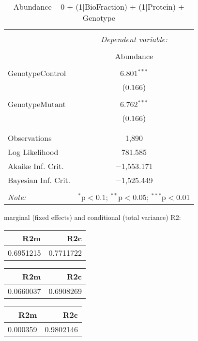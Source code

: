 \documentclass[11pt]{report}
\begin{document}
\begin{table}[!htbp] \centering 
  \caption{Abundance ~ 0 + (1|BioFraction) + (1|Protein) + Genotype} 
  \label{} 
\begin{tabular}{@{\extracolsep{5pt}}lc} 
\\[-1.8ex]\hline 
\hline \\[-1.8ex] 
 & \multicolumn{1}{c}{\textit{Dependent variable:}} \\ 
\cline{2-2} 
\\[-1.8ex] & Abundance \\ 
\hline \\[-1.8ex] 
 GenotypeControl & 6.801$^{***}$ \\ 
  & (0.166) \\ 
  & \\ 
 GenotypeMutant & 6.762$^{***}$ \\ 
  & (0.166) \\ 
  & \\ 
\hline \\[-1.8ex] 
Observations & 1,890 \\ 
Log Likelihood & 781.585 \\ 
Akaike Inf. Crit. & $-$1,553.171 \\ 
Bayesian Inf. Crit. & $-$1,525.449 \\ 
\hline 
\hline \\[-1.8ex] 
\textit{Note:}  & \multicolumn{1}{r}{$^{*}$p$<$0.1; $^{**}$p$<$0.05; $^{***}$p$<$0.01} \\ 
\end{tabular} 
\end{table} 
marginal (fixed effects) and conditional (total variance) R2:

\begin{tabular}{r|r}
\hline
R2m & R2c\\
\hline
0.6951215 & 0.7711722\\
\hline
\end{tabular}

\begin{tabular}{r|r}
\hline
R2m & R2c\\
\hline
0.0660037 & 0.6908269\\
\hline
\end{tabular}

\begin{tabular}{r|r}
\hline
R2m & R2c\\
\hline
0.000359 & 0.9802146\\
\hline
\end{tabular}
\end{document}
